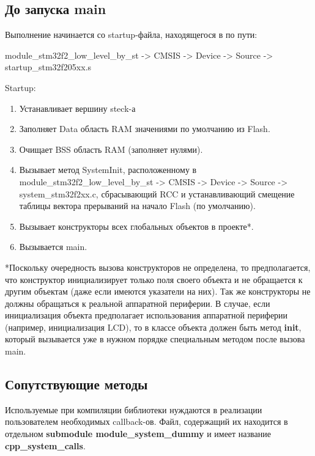 \documentclass[a4paper, 12pt]{article}
\begin{document}
\subsection{До запуска main}
Выполнение начинается со startup-файла, находящегося в по пути:

module\_stm32f2\_low\_level\_by\_st -> CMSIS -> Device -> Source -> startup\_stm32f205xx.s

Startup:
\begin{enumerate}
	\item Устанавливает вершину steck-а
	\item Заполняет Data область RAM значениями по умолчанию из Flash. 
	\item Очищает BSS область RAM (заполняет нулями).
	\item Вызывает метод SystemInit, расположенному в module\_stm32f2\_low\_level\_by\_st -> CMSIS -> Device -> Source -> system\_stm32f2xx.c, сбрасывающий RCC и устанавливающий смещение таблицы вектора прерываний на начало Flash (по умолчанию).
	\item Вызывает конструкторы всех глобальных объектов в проекте*. 
	\item Вызывается main.
\end{enumerate}
*Поскольку очередность вызова конструкторов не определена, то предполагается, что конструктор инициализирует только поля своего объекта и не обращается к другим объектам (даже если имеются указатели на них). Так же конструкторы не должны обращаться к реальной аппаратной периферии. В случае, если инициализация объекта предполагает использования аппаратной периферии (например, инициализация LCD), то в классе объекта должен быть метод \textbf{init}, который вызывается уже в нужном порядке специальным методом после вызова main.

\subsection{Сопутствующие методы}
Используемые при компиляции библиотеки нуждаются в реализации пользователем необходимых callback-ов. Файл, содержащий их находится в отдельном \textbf{submodule module\_\-system\_\-dummy} и имеет название \textbf{cpp\_system\_calls}.
\end{document}
